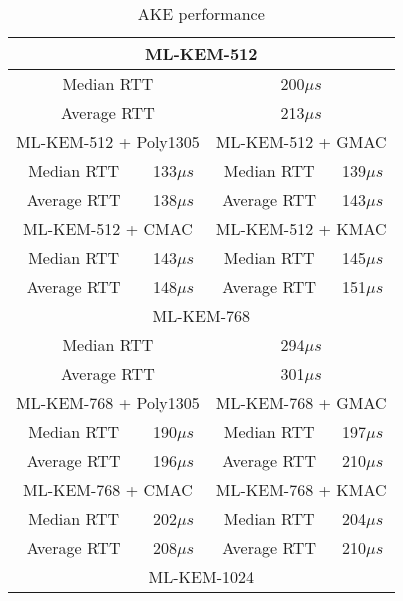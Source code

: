 \documentclass[floatrow,journal=tches,submission]{iacrtrans}
\newcommand{\us}{\mu s}
\begin{document}
\begin{table}[H]
    \caption{AKE performance}\label{tbl:ake}
    \begin{tabular}{|c|c|c|c|}
        \hline
        \multicolumn{4}{|c|}{ML-KEM-512} \\
        \hline
        \multicolumn{2}{|c|}{Median RTT}
        & \multicolumn{2}{|c|}{200$\us$} \\
        \hline
        \multicolumn{2}{|c|}{Average RTT}
        & \multicolumn{2}{|c|}{213$\us$} \\
        \hline\hline
        \multicolumn{2}{|c|}{ML-KEM-512 + Poly1305}
        & \multicolumn{2}{|c|}{ML-KEM-512 + GMAC} \\
        \hline
        Median RTT & 133$\us$ & Median RTT & 139$\us$ \\
        \hline
        Average RTT & 138$\us$ & Average RTT & 143$\us$ \\
        \hline\hline
        \multicolumn{2}{|c|}{ML-KEM-512 + CMAC}
        & \multicolumn{2}{|c|}{ML-KEM-512 + KMAC} \\
        \hline
        Median RTT & 143$\us$ & Median RTT & 145$\us$ \\
        \hline
        Average RTT & 148$\us$ & Average RTT & 151$\us$ \\
        \hline
        \multicolumn{4}{|c|}{ML-KEM-768} \\
        \hline
        \multicolumn{2}{|c|}{Median RTT}
        & \multicolumn{2}{|c|}{294$\us$} \\
        \hline
        \multicolumn{2}{|c|}{Average RTT}
        & \multicolumn{2}{|c|}{301$\us$} \\
        \hline\hline
        \multicolumn{2}{|c|}{ML-KEM-768 + Poly1305}
        & \multicolumn{2}{|c|}{ML-KEM-768 + GMAC} \\
        \hline
        Median RTT & 190$\us$ & Median RTT & 197$\us$ \\
        \hline
        Average RTT & 196$\us$ & Average RTT & 210$\us$ \\
        \hline\hline
        \multicolumn{2}{|c|}{ML-KEM-768 + CMAC}
        & \multicolumn{2}{|c|}{ML-KEM-768 + KMAC} \\
        \hline
        Median RTT & 202$\us$ & Median RTT & 204$\us$ \\
        \hline
        Average RTT & 208$\us$ & Average RTT & 210$\us$ \\
        \hline
        \multicolumn{4}{|c|}{ML-KEM-1024} \\
        \hline

\end{tabular}
\end{table}
\end{document}
